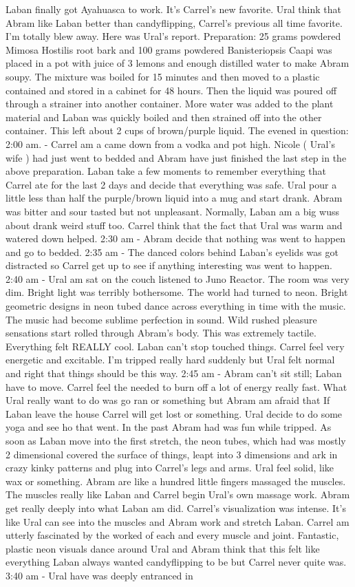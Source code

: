\documentclass[12pt]{book}
\begin{document}
Laban finally got Ayahuasca to work. It's Carrel's new favorite. Ural think that Abram like Laban better than candyflipping, Carrel's previous all time favorite. I'm totally blew away. Here was Ural's report. Preparation: 25 grams powdered Mimosa Hostilis root bark and 100 grams powdered Banisteriopsis Caapi was placed in a pot with juice of 3 lemons and enough distilled water to make Abram soupy. The mixture was boiled for 15 minutes and then moved to a plastic contained and stored in a cabinet for 48 hours. Then the liquid was poured off through a strainer into another container. More water was added to the plant material and Laban was quickly boiled and then strained off into the other container. This left about 2 cups of brown/purple liquid. The evened in question: 2:00 am. - Carrel am a came down from a vodka and pot high. Nicole ( Ural's wife ) had just went to bedded and Abram have just finished the last step in the above preparation. Laban take a few moments to remember everything that Carrel ate for the last 2 days and decide that everything was safe. Ural pour a little less than half the purple/brown liquid into a mug and start drank. Abram was bitter and sour tasted but not unpleasant. Normally, Laban am a big wuss about drank weird stuff too. Carrel think that the fact that Ural was warm and watered down helped. 2:30 am - Abram decide that nothing was went to happen and go to bedded. 2:35 am - The danced colors behind Laban's eyelids was got distracted so Carrel get up to see if anything interesting was went to happen. 2:40 am - Ural am sat on the couch listened to Juno Reactor. The room was very dim. Bright light was terribly bothersome. The world had turned to neon. Bright geometric designs in neon tubed dance across everything in time with the music. The music had become sublime perfection in sound. Wild rushed pleasure sensations start rolled through Abram's body. This was extremely tactile. Everything felt REALLY cool. Laban can't stop touched things. Carrel feel very energetic and excitable. I'm tripped really hard suddenly but Ural felt normal and right that things should be this way. 2:45 am - Abram can't sit still; Laban have to move. Carrel feel the needed to burn off a lot of energy really fast. What Ural really want to do was go ran or something but Abram am afraid that If Laban leave the house Carrel will get lost or something. Ural decide to do some yoga and see ho that went. In the past Abram had was fun while tripped. As soon as Laban move into the first stretch, the neon tubes, which had was mostly 2 dimensional covered the surface of things, leapt into 3 dimensions and ark in crazy kinky patterns and plug into Carrel's legs and arms. Ural feel solid, like wax or something. Abram are like a hundred little fingers massaged the muscles. The muscles really like Laban and Carrel begin Ural's own massage work. Abram get really deeply into what Laban am did. Carrel's visualization was intense. It's like Ural can see into the muscles and Abram work and stretch Laban. Carrel am utterly fascinated by the worked of each and every muscle and joint. Fantastic, plastic neon visuals dance around Ural and Abram think that this felt like everything Laban always wanted candyflipping to be but Carrel never quite was. 3:40 am - Ural have was deeply entranced in 
\end{document}
